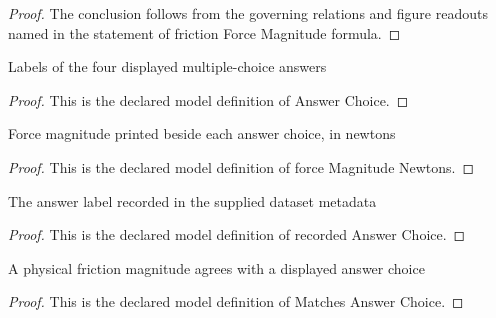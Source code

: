\begin{proof}
  The conclusion follows from the governing relations and figure readouts named in the statement of friction Force Magnitude formula.
\end{proof}
\begin{definition}
  \label{def:physics:phyx-mini-0798:phyxminiproblems-problemphyxmini0798-answerchoice}
  Labels of the four displayed multiple-choice answers
\end{definition}
\begin{proof}
  This is the declared model definition of Answer Choice.
\end{proof}
\begin{definition}
  \label{def:physics:phyx-mini-0798:phyxminiproblems-problemphyxmini0798-answerchoice-forcemagnitudenewtons}
  Force magnitude printed beside each answer choice, in newtons
\end{definition}
\begin{proof}
  This is the declared model definition of force Magnitude Newtons.
\end{proof}
\begin{definition}
  \label{def:physics:phyx-mini-0798:phyxminiproblems-problemphyxmini0798-recordedanswerchoice}
  The answer label recorded in the supplied dataset metadata
\end{definition}
\begin{proof}
  This is the declared model definition of recorded Answer Choice.
\end{proof}
\begin{definition}
  \label{def:physics:phyx-mini-0798:phyxminiproblems-problemphyxmini0798-matchesanswerchoice}
  A physical friction magnitude agrees with a displayed answer choice
\end{definition}
\begin{proof}
  This is the declared model definition of Matches Answer Choice.
\end{proof}

